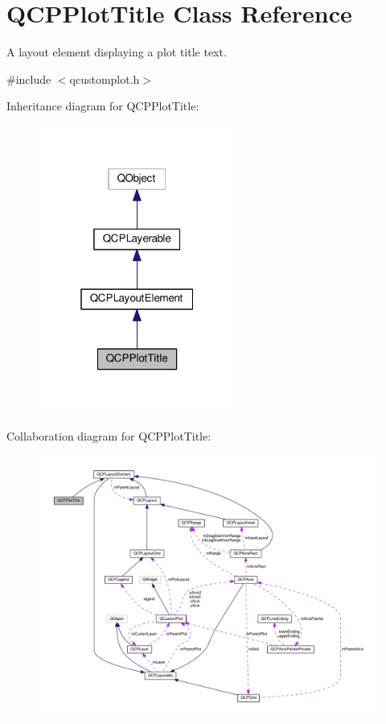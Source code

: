 \hypertarget{classQCPPlotTitle}{}\section{Q\+C\+P\+Plot\+Title Class Reference}
\label{classQCPPlotTitle}


A layout element displaying a plot title text.  




{\ttfamily \#include $<$qcustomplot.\+h$>$}



Inheritance diagram for Q\+C\+P\+Plot\+Title\+:
\nopagebreak
\begin{figure}[H]
\begin{center}
\leavevmode
\includegraphics[width=184pt]{classQCPPlotTitle__inherit__graph}
\end{center}
\end{figure}


Collaboration diagram for Q\+C\+P\+Plot\+Title\+:
\nopagebreak
\begin{figure}[H]
\begin{center}
\leavevmode
\includegraphics[width=350pt]{classQCPPlotTitle__coll__graph}
\end{center}
\end{figure}

